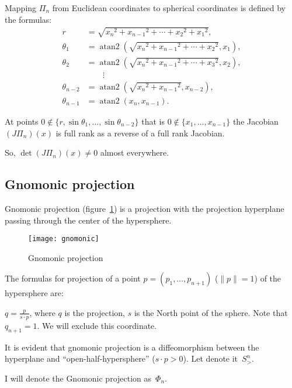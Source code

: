 \documentclass[oneside,draft]{amsart}
\begin{document}
Mapping $\Pi_n$ from Euclidean coordinates to spherical coordinates is defined by the formulas:
\[
\begin{aligned}r&={\textstyle {\sqrt {{x_{n}}^{2}+{x_{n-1}}^{2}+\cdots +{x_{2}}^{2}+{x_{1}}^{2}}}},\\\theta _{1}&=\operatorname {atan2} \left({\textstyle {\sqrt {{x_{n}}^{2}+{x_{n-1}}^{2}+\cdots +{x_{2}}^{2}}}},x_{1}\right),\\\theta _{2}&=\operatorname {atan2} \left({\textstyle {\sqrt {{x_{n}}^{2}+{x_{n-1}}^{2}+\cdots +{x_{3}}^{2}}}},x_{2}\right),\\&\qquad \vdots \\\theta _{n-2}&=\operatorname {atan2} \left({\textstyle {\sqrt {{x_{n}}^{2}+{x_{n-1}}^{2}}}},x_{n-2}\right),\\\theta _{n-1}&=\operatorname {atan2} \left(x_{n},x_{n-1}\right).\end{aligned}
\]  

At points $0\notin\{r,\sin\theta_1,\dots,\sin\theta_{n-2}\}$ that is $0\notin\{x_1,\dots,x_{n-1}\}$ the Jacobian $(J\Pi_n)(x)$
is full rank as a reverse of a full rank Jacobian.

So, $\det (J\Pi_n)(x)\ne 0$ almost everywhere.

\subsection{Gnomonic projection}

Gnomonic projection (figure~\ref{fig:gnomonic}) is a projection with the projection hyperplane passing through the center of the hypersphere.

\begin{figure}[hbt]
    \centering
    \texttt{[image: gnomonic]}
    \caption{Gnomonic projection}
    \label{fig:gnomonic}
\end{figure}

The formulas for projection of a point $p=(p_1,\dots,p_{n+1})$ ($\lVert p\rVert = 1$) of the hypersphere are:

$q=\frac{p}{s\cdot p}$, where $q$ is the projection, $s$ is the North point of the sphere. Note that $q_{n+1}=1$. We will exclude this coordinate.

It is evident that gnomonic projection is a diffeomorphism between the hyperplane and ``open-half-hy\-per\-sphe\-re'' ($s\cdot p>0$). Let denote it~$S^n_{>}$.

I will denote the Gnomonic projection as~$\Phi_n$.
\end{document}
